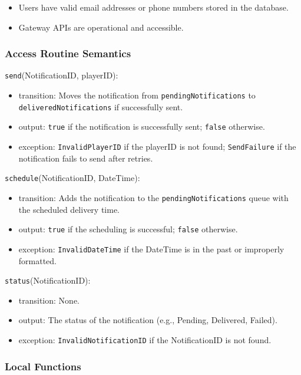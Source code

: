 \documentclass[12pt, titlepage]{article}
\begin{document}
\begin{itemize}
    \item Users have valid email addresses or phone numbers stored in the database.
    \item Gateway APIs are operational and accessible.
\end{itemize}

\subsubsection{Access Routine Semantics}

\noindent \texttt{send}(NotificationID, playerID):
\begin{itemize}
    \item transition: Moves the notification from \texttt{pendingNotifications} to \texttt{deliveredNotifications} if successfully sent.
    \item output: \texttt{true} if the notification is successfully sent; \texttt{false} otherwise.
    \item exception: \texttt{InvalidPlayerID} if the playerID is not found; \texttt{SendFailure} if the notification fails to send after retries.
\end{itemize}

\noindent \texttt{schedule}(NotificationID, DateTime):
\begin{itemize}
    \item transition: Adds the notification to the \texttt{pendingNotifications} queue with the scheduled delivery time.
    \item output: \texttt{true} if the scheduling is successful; \texttt{false} otherwise.
    \item exception: \texttt{InvalidDateTime} if the DateTime is in the past or improperly formatted.
\end{itemize}

\noindent \texttt{status}(NotificationID):
\begin{itemize}
    \item transition: None.
    \item output: The status of the notification (e.g., Pending, Delivered, Failed).
    \item exception: \texttt{InvalidNotificationID} if the NotificationID is not found.
\end{itemize}

\subsubsection{Local Functions}
\end{document}

